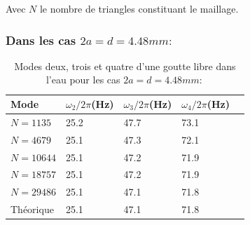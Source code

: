 \documentclass[a4paper]{report}
\begin{document}
Avec $N$ le nombre de triangles constituant le maillage.
\subsubsection{Dans les cas $2a = d = 4.48 mm :$}


\begin{table}[htp]
\begin{center}
    \begin{tabular}{ | l | l | l | l | l | }
    \hline
    Mode & $\omega_2/2\pi$(Hz) & $\omega_3/2\pi$(Hz) & $\omega_4/2\pi$(Hz) \\
    \hline
    $N = 1135$   & 25.2 & 47.7 & 73.1 \\ %
    \hline
    $N = 4679$   & 25.1 & 47.3 & 72.1 \\ %
    \hline
    $N = 10644$  & 25.1 & 47.2 & 71.9 \\ %
    \hline
    $N = 18757$  & 25.1 & 47.2 & 71.9 \\ %
    \hline
    $N = 29486$  & 25.1 & 47.1 & 71.8 \\ %
    \hline
    Théorique    & 25.1 & 47.1 & 71.8 \\
    \hline
    \end{tabular}
\end{center}
\caption{Modes deux, trois et quatre d'une goutte libre dans l'eau pour les cas $2a = d = 4.48 mm :$}
\end{table}
\end{document}

